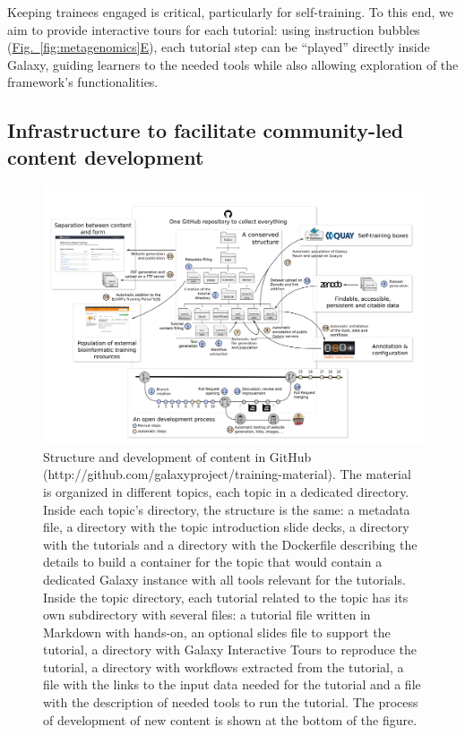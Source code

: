 Keeping trainees engaged is critical, particularly for self-training. To this end, we aim to provide interactive tours for each tutorial: using instruction bubbles (\hyperref[fig:metagenomics]{Fig.~\ref{fig:metagenomics}E}), each tutorial step can be “played” directly inside Galaxy, guiding learners to the needed tools while also allowing exploration of the framework’s functionalities.


\subsection*{Infrastructure to facilitate community-led content development}

\begin{figure}[t!]
    \centering
    \includegraphics[width=\textwidth]{chapters/images/training/training-figure-development.png}
    \caption{Structure and development of content in GitHub (http://github.com/galaxyproject/training-material). The material is organized in different topics, each topic in a dedicated directory. Inside each topic’s directory, the structure is the same: a metadata file, a directory with the topic introduction slide decks, a directory with the tutorials and a directory with the Dockerfile describing the details to build a container for the topic that would contain a dedicated Galaxy instance with all tools relevant for the tutorials. Inside the topic directory, each tutorial related to the topic has its own subdirectory with several files: a tutorial file written in Markdown with hands-on, an optional slides file to support the tutorial, a directory with Galaxy Interactive Tours to reproduce the tutorial, a directory with workflows extracted from the tutorial, a file with the links to the input data needed for the tutorial and a file with the description of needed tools to run the tutorial. The process of development of new content is shown at the bottom of the figure.}
    \label{fig:development}
\end{figure}

